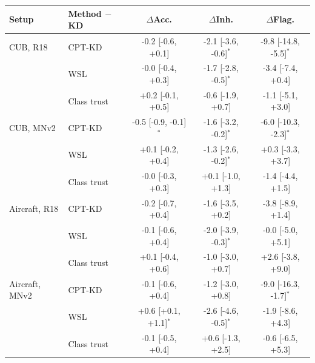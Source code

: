 \begin{tabular}{ll ccc}
\toprule
Setup & Method $-$ KD & $\Delta$Acc. & $\Delta$Inh. & $\Delta$Flag. \\
\midrule
CUB, R18 & CPT-KD & -0.2 [-0.6, +0.1] & -2.1 [-3.6, -0.6]$^*$ & -9.8 [-14.8, -5.5]$^*$ \\
 & WSL & -0.0 [-0.4, +0.3] & -1.7 [-2.8, -0.5]$^*$ & -3.4 [-7.4, +0.4] \\
 & Class trust & +0.2 [-0.1, +0.5] & -0.6 [-1.9, +0.7] & -1.1 [-5.1, +3.0] \\
\midrule
CUB, MNv2 & CPT-KD & -0.5 [-0.9, -0.1]$^*$ & -1.6 [-3.2, -0.2]$^*$ & -6.0 [-10.3, -2.3]$^*$ \\
 & WSL & +0.1 [-0.2, +0.4] & -1.3 [-2.6, -0.2]$^*$ & +0.3 [-3.3, +3.7] \\
 & Class trust & -0.0 [-0.3, +0.3] & +0.1 [-1.0, +1.3] & -1.4 [-4.4, +1.5] \\
\midrule
Aircraft, R18 & CPT-KD & -0.2 [-0.7, +0.4] & -1.6 [-3.5, +0.2] & -3.8 [-8.9, +1.4] \\
 & WSL & -0.1 [-0.6, +0.4] & -2.0 [-3.9, -0.3]$^*$ & -0.0 [-5.0, +5.1] \\
 & Class trust & +0.1 [-0.4, +0.6] & -1.0 [-3.0, +0.7] & +2.6 [-3.8, +9.0] \\
\midrule
Aircraft, MNv2 & CPT-KD & -0.1 [-0.6, +0.4] & -1.2 [-3.0, +0.8] & -9.0 [-16.3, -1.7]$^*$ \\
 & WSL & +0.6 [+0.1, +1.1]$^*$ & -2.6 [-4.6, -0.5]$^*$ & -1.9 [-8.6, +4.3] \\
 & Class trust & -0.1 [-0.5, +0.4] & +0.6 [-1.3, +2.5] & -0.6 [-6.5, +5.3] \\
\bottomrule
\end{tabular}
